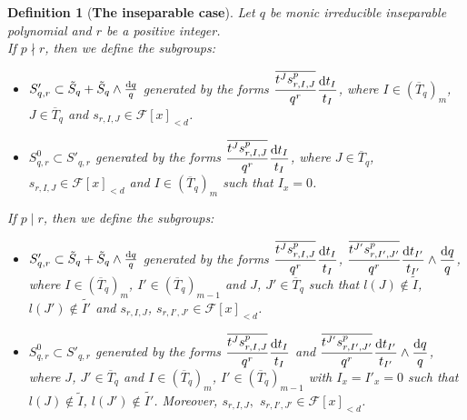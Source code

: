 \documentclass[times,10pt]{amsart}
\newcommand{\dd}{{\rm d}}
\newcommand{\F}{\ensuremath{\mathcal{F}}}
\newtheorem{defn}[thm]{Definition}%
\begin{document}
 \begin{defn}[\textbf{The inseparable case}]\label{d2f} Let $q$ be {monic irreducible inseparable polynomial} and $r$ be a positive integer.\\
  If $p\nmid r$, then we define the subgroups:
 \begin{itemize}
 \item  $  S'_{q,r}\subset \tilde{S}_q+ \tilde{S}_q\wedge \frac{\dd q}{q}$ generated by  the forms $ \displaystyle{\frac{ \overline{t^J s^p_{r,I,J}}}{ q^r}\frac{\dd t_I}{t_I}}$,  where  $I\in (\overline{T}_q)_m$, $J\in \overline{T}_q$ and $s_{r,I,J}\in \F[x]_{<d}$.
 \item  $S^0_{q,r}\subset S'_{q,r}$ generated by the forms $\displaystyle{\frac{\overline{t^Js^p_{r,I,J}}}{ q^r}\frac{\dd t_I}{t_I}}$, where $ J\in \overline{T}_q$, $ s_{r,I,J}\in \F[x]_{<d}$ and $I\in (\overline{T}_q)_m$ such that $I_x=0$.
\end{itemize}
  If {$p\mid r$}, then we define the subgroups:
 \begin{itemize}
 \item $ S'_{q,r}\subset \tilde{S}_q+ \tilde{S}_q\wedge \frac{\dd q}{q}$ generated by the forms    $ \displaystyle{\frac{\overline{t^J s^p_{r,I,J}}}{q^r}\frac{\dd t_I}{t_I}}$, $\displaystyle{\frac{ \overline{t^{J'} s^p_{r,I',J'}}}{q^r} \frac{\dd t_{I'}}{t_{I'}}\wedge \frac{\dd q}{q}}$,  where $ I\in (\overline{T}_q)_m$, $I'\in (\overline{T}_q)_{m-1}$ and $J$, $J'\in \overline{T}_q$ such that $ l(J)\notin \tilde{I}$, $l(J')\notin \tilde{I'}$ and  $s_{r,I,J}$,  $s_{r,I',J'}\in \F[x]_{<d}$. 
  \item  $ S^0_{q,r}\subset S'_{q,r}$  generated by the forms    $ \displaystyle{\frac{\overline{t^J s^p_{r,I,J}}}{q^r}\frac{\dd t_I}{t_I}}$ and $\displaystyle{\frac{ \overline{t^{J'} s^p_{r,I',J'}}}{q^r} \frac{\dd t_{I'}}{t_{I'}}\wedge \frac{\dd q}{q}}$,  where $J$, $J'\in \overline{T}_q$ and  $ I\in (\overline{T}_q)_m$, $I'\in (\overline{T}_q)_{m-1}$  with $I_x=I'_x=0$  such that $ l(J)\notin \tilde{I}$, $l(J')\notin \tilde{I'}$. Moreover,  $s_{r,I,J},$  $s_{r,I',J'}\in \F[x]_{<d}$. 
 \end{itemize}
\end{defn}
\medskip
\end{document}
